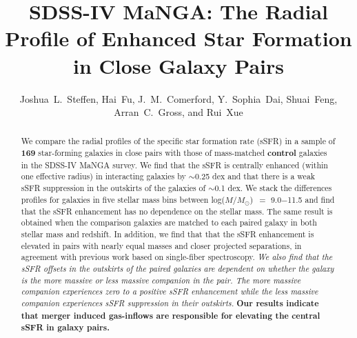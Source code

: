 \documentclass[iop,revtex4,twocolumn,apj,numberedappendix,appendixfloats]{emulateapj}
\newcommand{\logm}{log($M/M_{\odot}$)}
\begin{document}
\title{
SDSS-IV MaNGA: The Radial Profile of Enhanced Star Formation in Close Galaxy Pairs
}

\author{
Joshua~L.~Steffen, Hai~Fu, J.~M.~Comerford, Y.~Sophia~Dai, Shuai~Feng, Arran~C.~Gross, and Rui~Xue
}

\begin{abstract}
We compare the radial profiles of the specific star formation rate (sSFR) in a sample of \textbf{169} star-forming galaxies in close pairs with those of mass-matched \textbf{control} galaxies in the SDSS-IV MaNGA survey. We find that the sSFR is centrally enhanced (within one effective radius) in interacting galaxies by $\sim$0.25 dex and that there is a weak sSFR suppression in the outskirts of the galaxies of $\sim$0.1 dex. We stack the differences profiles for galaxies in five stellar mass bins between \logm\ $=$ 9.0$-$11.5 and find that the sSFR enhancement has no dependence on the stellar mass. The same result is obtained when the comparison galaxies are matched to each paired galaxy in both stellar mass and redshift. In addition, we find that that the sSFR enhancement is elevated in pairs with nearly equal masses and closer projected separations, in agreement with previous work based on single-fiber spectroscopy. {\it We also find that the sSFR offsets in the outskirts of the paired galaxies are dependent on whether the galaxy is the more massive or less massive companion in the pair. The more massive companion experiences zero to a positive sSFR enhancement while the less massive companion experiences sSFR suppression in their outskirts.} \textbf{Our results indicate that merger induced gas-inflows are responsible for elevating the central sSFR in galaxy pairs. }
\end{abstract}
\end{document}
